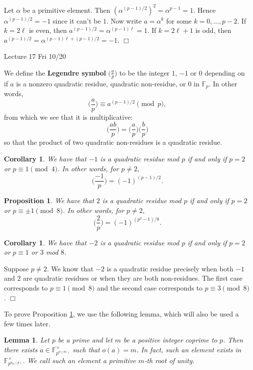 \documentclass{article}
\def\F{{\mathbb F}}
\def\F{{\mathbb F}}
\newtheorem{cor}[subsection]{Corollary}
\newtheorem{lemma}[subsection]{Lemma}
\newtheorem{proposition}[subsection]{Proposition}
\newenvironment{proof}{\noindent {\bf Proof:}}{$\Box$ \vspace{2 ex}}
\newcommand{\add}[1]{{\color{blue} #1}}
\renewcommand{\lg}[2]{\Big(\frac{#1}{#2}\Big)}
\begin{document}
\begin{proof}
    Let $\alpha$ be a primitive element. Then $(\alpha^{(p-1)/2})^2 = \alpha^{p-1} = 1$. Hence $\alpha^{(p-1)/2} = -1$ since it can't be $1$. Now write $a = \alpha^k$ for some $k = 0,\ldots,p-2$. If $k = 2\ell$ is even, then $a^{(p-1)/2} = \alpha^{(p-1)\ell} = 1$. If $k = 2\ell+1$ is odd, then $a^{(p-1)/2} = \alpha^{(p-1)\ell + (p-1)/2} = -1$.
\end{proof}

\begin{center}
    \add{Lecture 17 Fri 10/20}
\end{center}

We define the \textbf{Legendre symbol} $\displaystyle\lg{a}{p}$ to be the integer $1$, $-1$ or $0$ depending on if $a$ is a nonzero quadratic residue, quadratic non-residue, or $0$ in $\F_p$. In other words, $$\lg{a}{p} \equiv a^{(p-1)/2}\pmod{p},$$
from which we see that it is multiplicative:
$$\lg{ab}{p} = \lg{a}{p}\lg{b}{p}$$
so that the product of two quadratic non-residues is a quadratic residue.

\begin{cor}
    We have that $-1$ is a quadratic residue mod $p$ if and only if $p = 2$ or $p\equiv 1\pmod{4}$. In other words, for $p\neq 2,$ $$\lg{-1}{p} = (-1)^{(p-1)/2}.$$
\end{cor}

\begin{proposition}\label{prop:2p}
    We have that $2$ is a quadratic residue mod $p$ if and only if $p = 2$ or $p\equiv \pm1\pmod{8}$. In other words, for $p\neq 2,$ $$\lg{2}{p} = (-1)^{(p^2-1)/8}.$$
\end{proposition}

\begin{cor}
    We have that $-2$ is a quadratic residue mod $p$ if and only if $p = 2$ or $p\equiv 1$ or $3$ mod $8$.
\end{cor}

\begin{proof}
    Suppose $p\neq 2$. We know that $-2$ is a quadratic residue precisely when both $-1$ and $2$ are quadratic residues or when they are both non-residues. The first case corresponds to $p\equiv 1\pmod{8}$ and the second case corresponds to $p\equiv 3\pmod{8}$.
\end{proof}

To prove Proposition \ref{prop:2p}, we use the following lemma, which will also be used a few times later.

\begin{lemma}
    Let $p$ be a prime and let $m$ be a positive integer coprime to $p$. Then there exists $a\in\F_{p^{\phi(m)}}^\times$ such that $o(a) = m$. In fact, such an element exists in $\F_{p^{o_m(p)}}^\times.$ We call such an element a primitive $m$-th root of unity.
\end{lemma}
\end{document}

